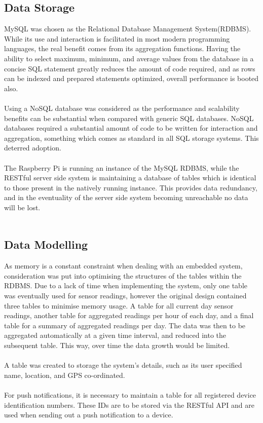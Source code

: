 \documentclass{article}
\begin{document}
\subsection{Data Storage}
MySQL was chosen as the Relational Database Management System(RDBMS). While its use and interaction is facilitated in most modern programming languages, the real benefit comes from its aggregation functions. Having the ability to select maximum, minimum, and average values from the database in a concise SQL statement greatly reduces the amount of code required, and as rows can be indexed and prepared statements optimized, overall performance is booted also. \\\\
Using a NoSQL database was considered as the performance and scalability benefits can be substantial when compared with generic SQL databases. NoSQL databases required a substantial amount of code to be written for interaction and aggregation, something which comes as standard in all SQL storage systems. This deterred adoption. \\\\
The Raspberry Pi is running an instance of the MySQL RDBMS, while the RESTful server side system is maintaining a database of tables which is identical to those present in the natively running instance. This provides data redundancy, and in the eventuality of the server side system becoming unreachable no data will be lost. \\\\
\subsection{Data Modelling}
As memory is a constant constraint when dealing with an embedded system, consideration was put into optimising the structures of the tables within the RDBMS. Due to a lack of time when implementing the system, only one table was eventually used for sensor readings, however the original design contained three tables to minimise memory usage. A table for all current day sensor readings, another table for aggregated readings per hour of each day, and a final table for a summary of aggregated readings per day. The data was then to be aggregated automatically at a given time interval, and reduced into the subsequent table. This way, over time the data growth would be limited. \\\\
A table was created to storage the system’s details, such as its user specified name, location, and GPS co-ordinated. \\\\
For push notifications, it is necessary to maintain a table for all registered device identification numbers. These IDs are to be stored via the RESTful API and are used when sending out a push notification to a device. \\\
\end{document}

